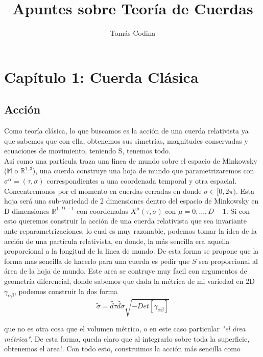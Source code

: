 \documentclass[]{article}
\title{Apuntes sobre Teoría de Cuerdas}
\author{Tomás Codina}
\date{}
\begin{document}
\maketitle


\section*{\hfil Capítulo 1: Cuerda Clásica \hfil}



\subsection*{Acción}

Como teoría clásica, lo que buscamos es la acción de una cuerda relativista ya que sabemos que con ella, obtenemos sus simetrías, magnitudes conservadas y ecuaciones de movimiento, teniendo S, tenemos todo.\\

\noindent Así como una partícula traza una linea de mundo sobre el espacio de Minkowsky ($\mathbb{M}$ o $ \mathbb{R}^{1,3} $), una cuerda
construye una hoja de mundo que parametrizaremos con $\sigma^{\alpha}=(\tau,\sigma)$
correspondientes a una coordenada temporal y otra espacial. Concentremonos
por el momento en cuerdas cerradas en donde $\sigma\in[0,2\pi)$.
Esta hoja será una sub-variedad de 2 dimensiones dentro del espacio de Minkowsky en D dimensiones $\mathbb{R}^{1,D-1}$ con coordenadas $X^{\mu}(\tau,\sigma)$ con $\mu=0,...,D-1$. Si con esto queremos
construir la acción de una cuerda relativista que sea invariante ante
reparametrizaciones, lo cual es muy razonable, podemos tomar la idea
de la acción de una partícula relativista, en donde, la más sencilla
era aquella proporcional a la longitud de la linea de mundo. De esta
forma se propone que la forma mas sencilla de hacerlo para una cuerda
es pedir que $S$ sea proporcional al área de la hoja de mundo. Este area se contruye muy facil con argumentos de geometría diferencial, donde sabemos que dada la métrica de mi variedad en 2D $ \gamma_{\alpha\beta} $, podemos construir la dos forma 
\begin{equation}\label{key}
\tilde{\sigma}=\tilde{d\tau}\tilde{d\sigma}\sqrt{-Det[\gamma_{\alpha\beta}]}
\end{equation}

\noindent que no es otra cosa que el volumen métrico, o en este caso particular \textit{"el área métrica"}. De esta forma, queda claro que al integrarlo sobre toda la superficie, obtenemos el area!. Con todo esto, construimos la acción más sencilla como  
\end{document}
